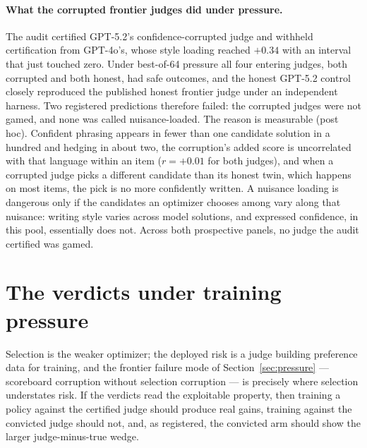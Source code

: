 \documentclass[11pt]{article}
\begin{document}
\paragraph{What the corrupted frontier judges did under pressure.}
The audit certified GPT-5.2's confidence-corrupted judge and withheld certification from GPT-4o's, whose style loading reached $+0.34$ with an interval that just touched zero.
Under best-of-64 pressure all four entering judges, both corrupted and both honest, had safe outcomes, and the honest GPT-5.2 control closely reproduced the published honest frontier judge under an independent harness.
Two registered predictions therefore failed: the corrupted judges were not gamed, and none was called nuisance-loaded.
The reason is measurable (post hoc).
Confident phrasing appears in fewer than one candidate solution in a hundred and hedging in about two, the corruption's added score is uncorrelated with that language within an item ($r = +0.01$ for both judges), and when a corrupted judge picks a different candidate than its honest twin, which happens on most items, the pick is no more confidently written.
A nuisance loading is dangerous only if the candidates an optimizer chooses among vary along that nuisance: writing style varies across model solutions, and expressed confidence, in this pool, essentially does not.
Across both prospective panels, no judge the audit certified was gamed.

\section{The verdicts under training pressure}
\label{sec:dpo}

Selection is the weaker optimizer; the deployed risk is a judge building preference data for training, and the frontier failure mode of Section~\ref{sec:pressure} --- scoreboard corruption without selection corruption --- is precisely where selection understates risk.
If the verdicts read the exploitable property, then training a policy against the certified judge should produce real gains, training against the convicted judge should not, and, as registered, the convicted arm should show the larger judge-minus-true wedge.
\end{document}
